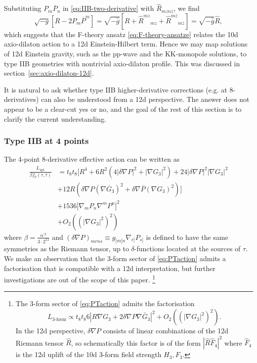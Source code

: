 Substituting $P_m\overline{P}_n$ in \eqref{eq:IIB-two-derivative} with $\widehat{R}_{mzn\overline{z}}$, we find
\begin{equation}
\sqrt{-g}[R - 2 P_m \overline{P}^m]
=\sqrt{-\widehat{g}}[R + \widehat{R}^{mz}{}_{mz} + \widehat{R}^{m\overline{z}}{}_{m\overline{z}}]
=\sqrt{-\widehat{g}} \widehat{R},
\label{eq:2-derivative-index-splitting}
\end{equation}
which suggests that the F-theory ansatz \eqref{eq:F-theory-ansatze} relates the 10d axio-dilaton action to a 12d Einstein-Hilbert term.
Hence we may map solutions of 12d Einstein gravity, such as the pp-wave and the KK-monopole solutions, to type IIB geometries with nontrivial axio-dilaton profile.
This was discussed in section~\ref{sec:axio-dilaton-12d}.

It is natural to ask whether type IIB higher-derivative corrections (e.g. at 8-derivatives) can also be understood from a 12d perspective.
The answer does not appear to be a clear-cut yes or no, and the goal of the rest of this section is to clarify the current understanding.

\subsubsection{Type IIB at 4 points}

The 4-point 8-derivative effective action can be written \cite{Liu:2025uqu,Minasian:2015bxa,Policastro:2008hg} as
\begin{equation}
\begin{aligned}
\frac{L_{\text{4pt}}}{\beta  f_{0}(\tau,\overline{\tau})}
&= t_{8}t_{8} \biggl[R^4+6R^{2}\left(4|\delta\nabla P|^{2}+|\nabla G_{3}|^{2}\right)+24|\delta \nabla P|^{2}|\nabla G_{3}|^{2}\\
&+12R\left(\delta \nabla P(\nabla\overline{G}_{3})^{2}+\delta \nabla \overline{P}(\nabla{G}_{3})^{2}\right)\biggr]\\
&+1536 |\nabla_m P_n \nabla^m P^n|^2\\
&+O_{2}\left((|\nabla G_{3}|^{2})^{2}\right)
\label{eq:PTaction}
\end{aligned}
\end{equation}
where $\beta = \frac{\alpha^{\prime 3}}{3 \cdot 2^{12}}$ and $(\delta \nabla P)_{mrns} \equiv g_{[m[n} \nabla_{r]} P_{s]}$ is defined to have the same symmetries as the Riemann tensor, up to $\delta$-functions located at the sources of $\tau$.
We make an observation that the 3-form sector of \eqref{eq:PTaction} admits a factorisation that is compatible with a 12d interpretation, but further investigations are out of the scope of this paper.%
\footnote{
\label{footnote:3-form-factorisation}
The 3-form sector of \eqref{eq:PTaction} admits the factorisation
\begin{equation}
L_{\text{3-form}}
\propto
t_8t_8
6 |R \nabla G_3 + 2 \delta \nabla P \nabla \bar{G}_3|^2
+O_{2}\left((|\nabla G_{3}|^{2})^{2}\right).
\end{equation}
In the 12d perspective, $\delta \nabla P$ consists of linear combinations of the 12d Riemann tensor $\widehat{R}$, so schematically this factor is of the form $|\widehat{R} \widehat{F}_4|^2$ where $\widehat{F}_4$ is the 12d uplift of the 10d 3-form field strength $H_3, F_3$.
}

